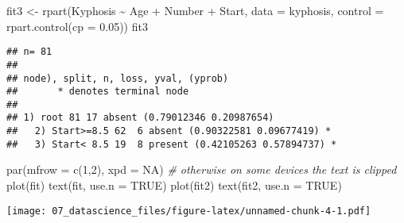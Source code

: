 \documentclass[
]{book}
\newenvironment{Shaded}{\begin{snugshade}}{\end{snugshade}}
\newcommand{\AttributeTok}[1]{\textcolor[rgb]{0.77,0.63,0.00}{#1}}
\newcommand{\CommentTok}[1]{\textcolor[rgb]{0.56,0.35,0.01}{\textit{#1}}}
\newcommand{\ConstantTok}[1]{\textcolor[rgb]{0.00,0.00,0.00}{#1}}
\newcommand{\DecValTok}[1]{\textcolor[rgb]{0.00,0.00,0.81}{#1}}
\newcommand{\FloatTok}[1]{\textcolor[rgb]{0.00,0.00,0.81}{#1}}
\newcommand{\FunctionTok}[1]{\textcolor[rgb]{0.00,0.00,0.00}{#1}}
\newcommand{\NormalTok}[1]{#1}
\newcommand{\OtherTok}[1]{\textcolor[rgb]{0.56,0.35,0.01}{#1}}
\newcommand{\SpecialCharTok}[1]{\textcolor[rgb]{0.00,0.00,0.00}{#1}}
\begin{document}
\begin{Shaded}
\begin{Highlighting}[]
\NormalTok{fit3 }\OtherTok{\textless{}{-}} \FunctionTok{rpart}\NormalTok{(Kyphosis }\SpecialCharTok{\textasciitilde{}}\NormalTok{ Age }\SpecialCharTok{+}\NormalTok{ Number }\SpecialCharTok{+}\NormalTok{ Start, }\AttributeTok{data =}\NormalTok{ kyphosis,}
              \AttributeTok{control =} \FunctionTok{rpart.control}\NormalTok{(}\AttributeTok{cp =} \FloatTok{0.05}\NormalTok{))}
\NormalTok{fit3}
\end{Highlighting}
\end{Shaded}

\begin{verbatim}
## n= 81 
## 
## node), split, n, loss, yval, (yprob)
##       * denotes terminal node
## 
## 1) root 81 17 absent (0.79012346 0.20987654)  
##   2) Start>=8.5 62  6 absent (0.90322581 0.09677419) *
##   3) Start< 8.5 19  8 present (0.42105263 0.57894737) *
\end{verbatim}

\begin{Shaded}
\begin{Highlighting}[]
\FunctionTok{par}\NormalTok{(}\AttributeTok{mfrow =} \FunctionTok{c}\NormalTok{(}\DecValTok{1}\NormalTok{,}\DecValTok{2}\NormalTok{), }\AttributeTok{xpd =} \ConstantTok{NA}\NormalTok{) }\CommentTok{\# otherwise on some devices the text is clipped}
\FunctionTok{plot}\NormalTok{(fit)}
\FunctionTok{text}\NormalTok{(fit, }\AttributeTok{use.n =} \ConstantTok{TRUE}\NormalTok{)}
\FunctionTok{plot}\NormalTok{(fit2)}
\FunctionTok{text}\NormalTok{(fit2, }\AttributeTok{use.n =} \ConstantTok{TRUE}\NormalTok{)}
\end{Highlighting}
\end{Shaded}

\texttt{[image: 07\_datascience\_files/figure-latex/unnamed-chunk-4-1.pdf]}
\end{document}
